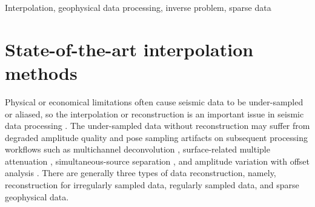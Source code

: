 \documentclass[preprint,amsmath,authoryear,12pt,manuscript]{elsarticle}
\DeclareRobustCommand{\dlo}[1]{}
\DeclareRobustCommand{\wen}[1]{#1}
\begin{document}
\begin{frontmatter}
\begin{keyword}
Interpolation, geophysical data processing, inverse problem, sparse data
\end{keyword}

\end{frontmatter}

\wen{\section{State-of-the-art interpolation methods}}
Physical or economical limitations often cause seismic data to be under-sampled or aliased, so the interpolation or reconstruction is an important issue in seismic data processing \cite[]{trahanias1993vector,hongbo2015,hanxue2015,yufeng2017,schneider2017improvement}. The under-sampled data without reconstruction may suffer from degraded amplitude quality and pose sampling artifacts on subsequent processing workflows such as multichannel deconvolution \cite[]{kazemi2016}, surface-related multiple attenuation \cite[]{chenwei2017emd}, simultaneous-source separation \cite[]{yanhui2016,yatong2017}, and amplitude variation with offset analysis \cite[]{keys1981cubic,abma2006}. There are generally \dlo{two}\wen{three} types of data reconstruction, namely, \dlo{reconstruction for regularly sampled data and reconstruction for irregularly sampled data.}\wen{reconstruction for irregularly sampled data, regularly sampled data, and sparse geophysical data. }
\end{document}
